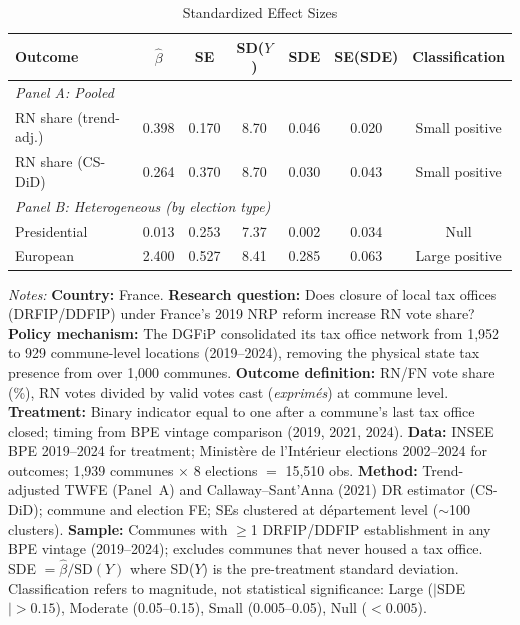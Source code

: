 \begin{table}[htbp]
\centering
\small
\caption{Standardized Effect Sizes}
\label{tab:sde}
\begin{tabular}{lcccccc}
\toprule
Outcome & $\hat{\beta}$ & SE & SD($Y$) & SDE & SE(SDE) & Classification \\
\midrule
\multicolumn{7}{l}{\textit{Panel A: Pooled}} \\
RN share (trend-adj.) & 0.398 & 0.170 & 8.70 & 0.046 & 0.020 & Small positive \\
RN share (CS-DiD) & 0.264 & 0.370 & 8.70 & 0.030 & 0.043 & Small positive \\
\midrule
\multicolumn{7}{l}{\textit{Panel B: Heterogeneous (by election type)}} \\
Presidential & 0.013 & 0.253 & 7.37 & 0.002 & 0.034 & Null \\
European & 2.400 & 0.527 & 8.41 & 0.285 & 0.063 & Large positive \\
\bottomrule
\end{tabular}
\begin{tablenotes}[flushleft]
\scriptsize
\item \textit{Notes:}
\textbf{Country:} France.
\textbf{Research question:} Does closure of local tax offices (DRFIP/DDFIP) under France's 2019 NRP reform increase RN vote share?
\textbf{Policy mechanism:} The DGFiP consolidated its tax office network from 1,952 to 929 commune-level locations (2019--2024), removing the physical state tax presence from over 1,000 communes.
\textbf{Outcome definition:} RN/FN vote share (\%), RN votes divided by valid votes cast (\textit{exprim\'es}) at commune level.
\textbf{Treatment:} Binary indicator equal to one after a commune's last tax office closed; timing from BPE vintage comparison (2019, 2021, 2024).
\textbf{Data:} INSEE BPE 2019--2024 for treatment; Minist\`ere de l'Int\'erieur elections 2002--2024 for outcomes; 1,939 communes $\times$ 8 elections $=$ 15,510 obs.
\textbf{Method:} Trend-adjusted TWFE (Panel~A) and Callaway--Sant'Anna (2021) DR estimator (CS-DiD); commune and election FE; SEs clustered at d\'epartement level ($\sim$100 clusters).
\textbf{Sample:} Communes with $\geq$1 DRFIP/DDFIP establishment in any BPE vintage (2019--2024); excludes communes that never housed a tax office.
SDE $= \hat{\beta} / \text{SD}(Y)$ where SD($Y$) is the pre-treatment standard deviation. Classification refers to magnitude, not statistical significance: Large ($|$SDE$| > 0.15$), Moderate (0.05--0.15), Small (0.005--0.05), Null ($< 0.005$).
\end{tablenotes}
\end{table}

